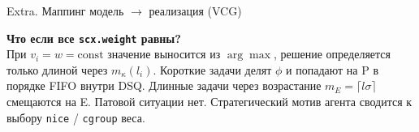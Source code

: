 \documentclass[aspectratio=169,11pt]{beamer}
\begin{document}
\begin{frame}{Extra. Маппинг модель $\to$ реализация (VCG)}
        \vspace{0.25cm}
        \begin{shadowbox}
                \footnotesize
                \textbf{Что если все \texttt{scx.weight} равны?}\\
                При $v_i = w = \mathrm{const}$ значение выносится из
                $\arg\max$, решение определяется только длиной через
                $m_\kappa(l_i)$. Короткие задачи делят $\phi$ и
                попадают на P в порядке FIFO внутри DSQ. Длинные
                задачи через возрастание $m_E = \lceil l\sigma \rceil$
                смещаются на E. Патовой ситуации нет. Стратегический
                мотив агента сводится к выбору \texttt{nice} /
                \texttt{cgroup} веса.
        \end{shadowbox}
\end{frame}
\addtocounter{framenumber}{-1}
\end{document}
